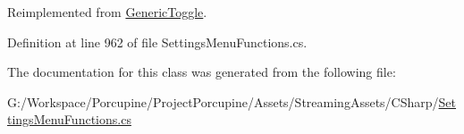 Reimplemented from \hyperlink{class_generic_toggle_a11d9c35a3c20308376d1a126c3bfc874}{Generic\+Toggle}.



Definition at line 962 of file Settings\+Menu\+Functions.\+cs.



The documentation for this class was generated from the following file\+:\begin{DoxyCompactItemize}
\item 
G\+:/\+Workspace/\+Porcupine/\+Project\+Porcupine/\+Assets/\+Streaming\+Assets/\+C\+Sharp/\hyperlink{_settings_menu_functions_8cs}{Settings\+Menu\+Functions.\+cs}\end{DoxyCompactItemize}
